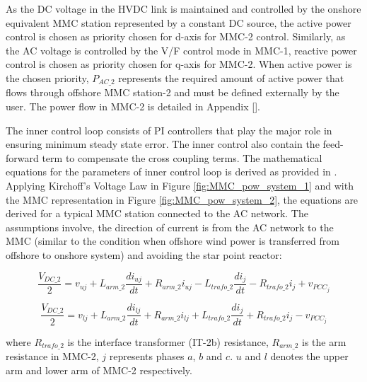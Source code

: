 As the \gls{DC} voltage in the \gls{HVDC} link is maintained and controlled by the onshore equivalent \gls{MMC} station represented by a constant \gls{DC} source, the active power control is chosen as priority chosen for d-axis for \gls{MMC}-2 control. Similarly, as the \gls{AC} voltage is controlled by the V/F control mode in \gls{MMC}-1, reactive power control is chosen as priority chosen for q-axis for \gls{MMC}-2. When active power is the chosen priority, $P_{AC\_2}$ represents the required amount of active power that flows through offshore \gls{MMC} station-2 and must be defined externally by the user. The power flow in \gls{MMC}-2 is detailed in Appendix [].  


The inner control loop consists of \gls{PI} controllers that play the major role in ensuring minimum steady state error. The inner control also contain the feed-forward term to compensate the cross coupling terms. The mathematical equations for the parameters of inner control loop is derived as provided in \cite{saad2015modelisation}. Applying Kirchoff's Voltage Law in Figure \ref{fig:MMC_pow_system_1} and with the \gls{MMC} representation in Figure \ref{fig:MMC_pow_system_2}, the equations are derived for a typical \gls{MMC} station connected to the \gls{AC} network. The assumptions involve, the direction of current is from the \gls{AC} network to the \gls{MMC} (similar to the condition when offshore wind power is transferred from offshore to onshore system) and avoiding the star point reactor:

\begin{equation}
    \frac{V_{DC\_2}}{2} = v_{uj} + L_{arm\_2}\frac{di_{uj}}{dt} + R_{arm\_2}i_{uj} - L_{trafo\_2}\frac{di_{j}}{dt} - R_{trafo\_2}i_j + v_{PCC_j}
\end{equation}

\begin{equation}
    \frac{V_{DC\_2}}{2} = v_{lj} + L_{arm\_2}\frac{di_{lj}}{dt} + R_{arm\_2}i_{lj} + L_{trafo\_2}\frac{di_{j}}{dt} + R_{trafo\_2}i_j - v_{PCC_j}
\end{equation}

where $R_{trafo\_2}$ is the interface transformer (IT-2b) resistance, $R_{arm\_2}$ is the arm resistance in \gls{MMC}-2, $j$ represents phases $a$, $b$ and $c$. $u$ and $l$ denotes the upper arm and lower arm of \gls{MMC}-2 respectively.

